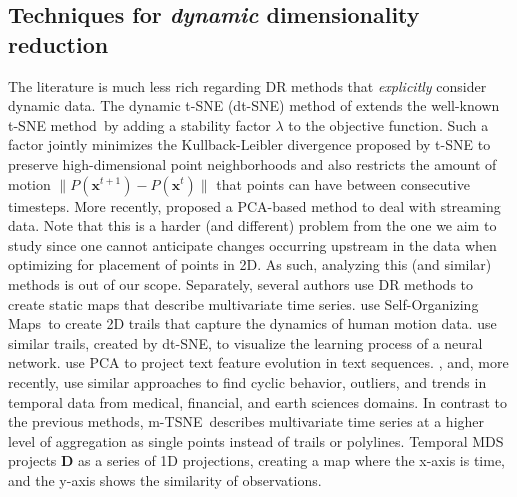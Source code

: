 \subsection{Techniques for \emph{dynamic} dimensionality reduction}
%
The literature is much less rich regarding DR methods that \emph{explicitly} consider dynamic data. The dynamic t-SNE (dt-SNE) method of \cite{Rauber2016} extends the well-known t-SNE method\,\citep{tsne} by adding a stability factor $\lambda$ to the objective function. Such a factor jointly minimizes the Kullback-Leibler divergence proposed by t-SNE to preserve high-dimensional point neighborhoods and also restricts the amount of motion $\| P(\mathbf{x}^{t+1}) - P(\mathbf{x}^t) \|$ that points can have between consecutive timesteps. More recently, \cite{Fujiwara2019} proposed a PCA-based method to deal with streaming data. Note that this is a harder (and different) problem from the one we aim to study since one cannot anticipate changes occurring upstream in the data when optimizing for placement of points in 2D. As such, analyzing this (and similar) methods is out of our scope. Separately, several authors use DR methods to create static maps that describe multivariate time series. \cite{Hu2010} use Self-Organizing Maps\,\citep{Kohonen1997} to create 2D trails that capture the dynamics of human motion data. \cite{Rauber2017} use similar trails, created by dt-SNE, to visualize the learning process of a neural network. \cite{Mao2007} use PCA to project text feature evolution in text sequences. \cite{Ward2011}, \cite{bws12} and, more recently, \cite{Ali2019} use similar approaches to find cyclic behavior, outliers, and trends in temporal data from medical, financial, and earth sciences domains.
%
In contrast to the previous methods, m-TSNE\,\citep{Nguyen2017} describes multivariate time series at a higher level of aggregation as single points instead of trails or polylines. Temporal MDS\,\citep{Jackle2016} projects $\mathbf{D}$ as a series of 1D projections, creating a map where the x-axis is time, and the y-axis shows the similarity of observations.

